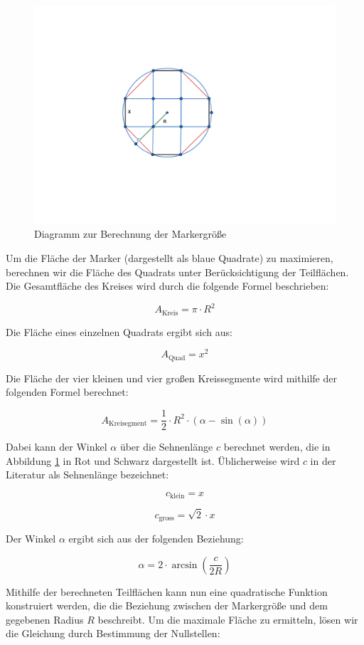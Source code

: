 \begin{figure}[H]
    \centering
    \includegraphics[width=\linewidth]{graphics/marker.png}
    \caption{Diagramm zur Berechnung der Markergröße}
    \label{fig:marker}
\end{figure}

Um die Fläche der Marker (dargestellt als blaue Quadrate) zu maximieren, berechnen wir die Fläche des Quadrats unter Berücksichtigung der Teilflächen. Die Gesamtfläche des Kreises wird durch die folgende Formel beschrieben:

\[
A_\text{Kreis} = \pi \cdot R^2
\]

Die Fläche eines einzelnen Quadrats ergibt sich aus:

\[
A_{\text{Quad}} = x^2
\]

Die Fläche der vier kleinen und vier großen Kreissegmente wird mithilfe der folgenden Formel berechnet:

\[
A_\text{Kreisegment} = \frac{1}{2} \cdot R^2 \cdot (\alpha - \sin(\alpha))
\]

Dabei kann der Winkel \(\alpha\) über die Sehnenlänge \(c\) berechnet werden, die in Abbildung \ref{fig:marker} in Rot und Schwarz dargestellt ist. Üblicherweise wird \(c\) in der Literatur als Sehnenlänge bezeichnet:

\[
c_\text{klein} = x
\]

\[
c_\text{gross} = \sqrt{2} \cdot x
\]

Der Winkel \(\alpha\) ergibt sich aus der folgenden Beziehung:

\[
\alpha = 2 \cdot \arcsin\left(\frac{c}{2R}\right)
\]

Mithilfe der berechneten Teilflächen kann nun eine quadratische Funktion konstruiert werden, die die Beziehung zwischen der Markergröße und dem gegebenen Radius \(R\) beschreibt. Um die maximale Fläche zu ermitteln, lösen wir die Gleichung durch Bestimmung der Nullstellen:

